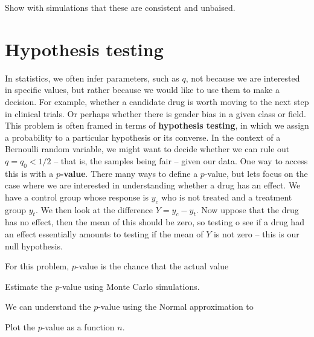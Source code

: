 \begin{exercise}
Show with simulations that these are consistent and unbaised.  
\end{exercise} 



\section{Hypothesis testing}
In statistics, we often infer parameters, such as $q$, not because we are interested in specific values, but rather because we would like to use them to make a decision. For example, whether a candidate drug is worth moving to the next step in clinical trials. Or perhaps whether there is gender bias in a given class or field.  This problem is often framed in terms of {\bf hypothesis testing}, in which we assign a probability to a particular hypothesis or its converse. In the context of a Bernoulli random variable, we might want to decide whether we can rule out $q=q_0 <1/2$ -- that is, the samples being fair -- given our data. One way to access this is with a {\bf $p$-value}. There many ways to define a $p$-value, but lets focus on the case where we are interested in understanding whether a drug has an effect. We have a control group whose response is $y_c$ who is not treated and a treatment group $y_t$. We then look at the difference $Y = y_c-y_t$. Now uppose that the drug has no effect, then the mean of this should be zero, so testing o see if a drug had an effect essentially amounts to testing if the mean of $Y$ is not zero -- this is our null hypothesis. 

For this problem, $p$-value is the chance that the actual value 



\begin{exercise}
Estimate the $p$-value using Monte Carlo simulations. 
\end{exercise} 

We can understand the $p$-value using the Normal approximation to 

\begin{exercise}
Plot the $p$-value as a function $n$. 
\end{exercise} 







